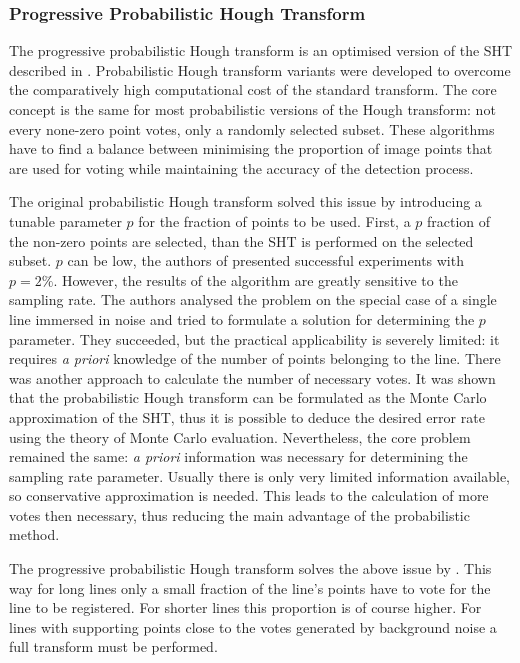 \subsubsection{Progressive Probabilistic Hough Transform}

The progressive probabilistic Hough transform is an optimised version of the SHT described in \cite{MATAS2000119}.
Probabilistic Hough transform variants were developed to overcome the comparatively high computational cost of the standard transform.
The core concept is the same for most probabilistic versions of the Hough transform: not every none-zero point votes, only a randomly selected subset.
These algorithms have to find a balance between minimising the proportion of image points that are used for voting while maintaining the accuracy of the detection process.

The original probabilistic Hough transform\cite{KIRYATI1991303} solved this issue by introducing a tunable parameter $p$ for the fraction of points to be used.
First, a $p$ fraction of the non-zero points are selected, than the SHT is performed on the selected subset.
$p$ can be low, the authors of \cite{KIRYATI1991303} presented successful experiments with $p=2\%$.
However, the results of the algorithm are greatly sensitive to the sampling rate.
The authors analysed the problem on the special case of a single line immersed in noise and tried to formulate a solution for determining the $p$ parameter.
They succeeded, but the practical applicability is severely limited\cite{MATAS2000119}: it requires \textit{a priori} knowledge of the number of points belonging to the line.
There was another approach to calculate the number of necessary votes\cite{BERGEN1991639}.
It was shown that the probabilistic Hough transform can be formulated as the Monte Carlo approximation of the SHT, thus it is possible to deduce the desired error rate using the theory of Monte Carlo evaluation.
Nevertheless, the core problem remained the same: \textit{a priori} information was necessary for determining the sampling rate parameter.
Usually there is only very limited information available, so conservative approximation is needed.
This leads to the calculation of more votes then necessary, thus reducing the main advantage of the probabilistic method.

The progressive probabilistic Hough transform solves the above issue by \cite{MATAS2000119}.
This way for long lines only a small fraction of the line's points have to vote for the line to be registered.
For shorter lines this proportion is of course higher.
For lines with supporting points close to the votes generated by background noise a full transform must be performed.

